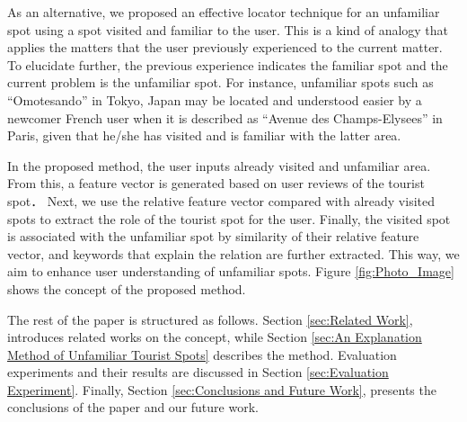 \documentclass[journal]{IAENGtran}
\begin{document}
As an alternative, we proposed an effective locator technique for an unfamiliar spot using a spot visited and familiar to the user.
This is a kind of analogy that applies the matters that the user previously experienced to the current matter.
To elucidate further, the previous experience indicates the familiar spot and the current problem is the unfamiliar spot.
For instance, unfamiliar spots such as ``Omotesando'' in Tokyo, Japan may be located and understood easier by a newcomer French user when it is described as ``Avenue des Champs-Elysees'' in Paris, given that he/she has visited and is familiar with the latter area.

In the proposed method, the user inputs already visited and unfamiliar area.
From this, a feature vector is generated based on user reviews of the tourist spot．
Next, we use the relative feature vector compared with already visited spots to extract the role of the tourist spot for the user.
Finally, the visited spot is associated with the unfamiliar spot by similarity of their relative feature vector, and keywords that explain the relation are further extracted.
This way, we aim to enhance user understanding of unfamiliar spots.
Figure \ref{fig:Photo_Image} shows the concept of the proposed method.

The rest of the paper is structured as follows.
Section \ref{sec:Related Work}, introduces related works on the concept, while Section \ref{sec:An Explanation Method of Unfamiliar Tourist Spots} describes the method.
Evaluation experiments and their results are discussed in Section \ref{sec:Evaluation Experiment}.
Finally, Section \ref{sec:Conclusions and Future Work}, presents the conclusions of the paper and our future work.
\end{document}
